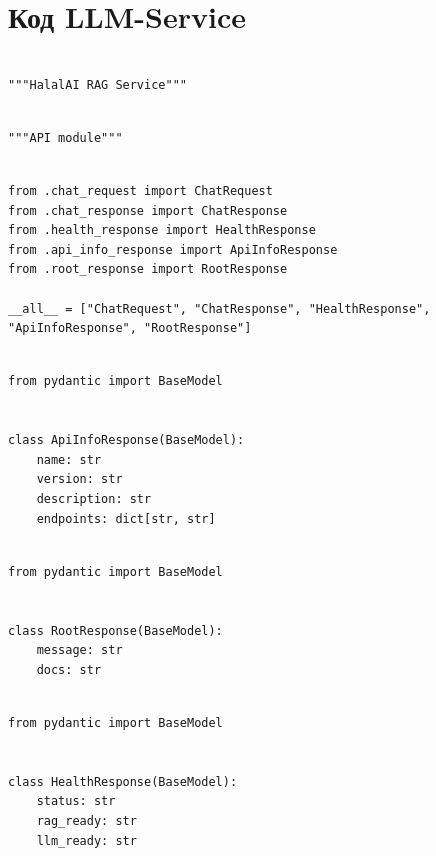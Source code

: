 \chapter{Код LLM-Service}\label{app:llm}
\setcounter{tocdepth}{-1}\setcounter{secnumdepth}{-1}

\begin{lstlisting}[basicstyle=\tiny\ttfamily,breaklines=true]

"""HalalAI RAG Service"""
\end{lstlisting}

\begin{lstlisting}[basicstyle=\tiny\ttfamily,breaklines=true]

"""API module"""
\end{lstlisting}

\begin{lstlisting}[basicstyle=\tiny\ttfamily,breaklines=true]

from .chat_request import ChatRequest
from .chat_response import ChatResponse
from .health_response import HealthResponse
from .api_info_response import ApiInfoResponse
from .root_response import RootResponse

__all__ = ["ChatRequest", "ChatResponse", "HealthResponse", "ApiInfoResponse", "RootResponse"]
\end{lstlisting}

\begin{lstlisting}[basicstyle=\tiny\ttfamily,breaklines=true]

from pydantic import BaseModel


class ApiInfoResponse(BaseModel):
    name: str
    version: str
    description: str
    endpoints: dict[str, str]
\end{lstlisting}

\begin{lstlisting}[basicstyle=\tiny\ttfamily,breaklines=true]

from pydantic import BaseModel


class RootResponse(BaseModel):
    message: str
    docs: str
\end{lstlisting}

\begin{lstlisting}[basicstyle=\tiny\ttfamily,breaklines=true]

from pydantic import BaseModel


class HealthResponse(BaseModel):
    status: str
    rag_ready: str
    llm_ready: str
\end{lstlisting}

